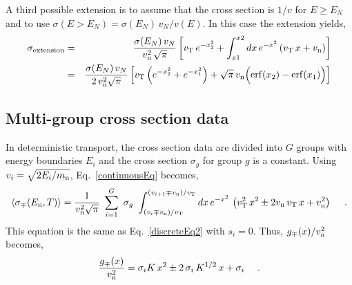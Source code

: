 \documentclass[11pt,twoside]{article}
\begin{document}
A third possible extension is to assume that the cross section is $ 1/v$ for $E \ge E_N$ and to use
$\sigma(E > E_N) = \sigma(E_N) \, v_N / v(E)$.  In this case the extension yields,
\begin{eqnarray}
	\sigma_{\rm extension} & = & { \sigma(E_N) \, v_N \over v_{\rm n}^2 \, \sqrt{\pi} }
            \left[ v_{\rm T} \, e^{-x_2^2} + \int_{x1}^{x2} dx \, e^{-x^2} \, ( v_{\rm T} \, x + v_{\rm n} ) \right] \nonumber \\
        & = & { \sigma(E_N) \, v_N \over 2 \, v_{\rm n}^2 \sqrt{\pi} } 
		    \left[ v_{\rm T} \left( e^{-x_2^2 } + e^{-x_1^2} \right) + \sqrt{\pi} \, v_{\rm n} \Big( {\rm erf}(x_2) - {\rm erf}(x_1) \Big) \right]
\end{eqnarray}

\subsection{Multi-group cross section data} \label{mgroupxsec}
In deterministic transport, the cross section data are divided into $G$ groups with energy boundaries
$E_i$ and the cross section $\sigma_g$ for group $g$ is a constant.
Using $v_i = \sqrt{2 E_i / m_{\rm n}}$, Eq.~\ref{continuousEq} becomes,
\begin{equation}
    \left<\sigma_\mp(E_{\rm n},T)\right> = { 1 \over v_{\rm n}^2 \sqrt{\pi} } \ \sum_{i=1}^{G} \ \sigma_g \ 
    \int_{( v_i \mp v_{\rm n} ) / v_{\rm T}}^{( v_{i+1} \mp v_{\rm n} ) / v_{\rm T}} dx \, e^{-x^2} \, 
	\left( v_{\rm T}^2 \, x^2 \pm 2 v_{\rm n} \, v_{\rm T} \, x + v_{\rm n}^2 \right) \ \ \ \ .
\end{equation}
This equation is the same as Eq.~\ref{discreteEq2} with $s_i = 0$. Thus, $g_\mp(x) / v_{\rm n}^2$ becomes,
\begin{equation}
    { g_\mp(x) \over v_{\rm n}^2 } = \sigma_i K \, x^2 \pm 2 \, \sigma_i \, K^{1/2} \, x + \sigma_i \ \ \ \ .
\end{equation}
\end{document}
